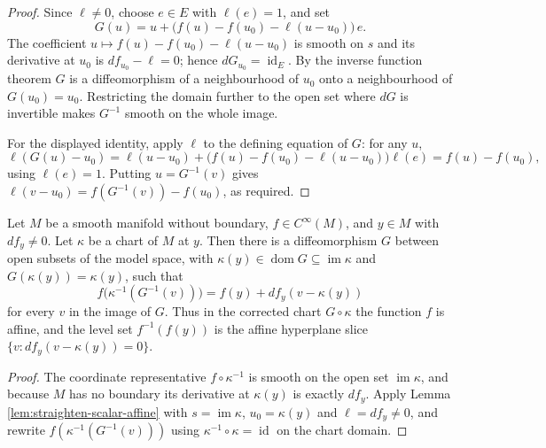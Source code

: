 \begin{proof}
\leanok
Since $\ell \neq 0$, choose $e \in E$ with $\ell(e) = 1$, and set
\[
  G(u) = u + \bigl(f(u) - f(u_0) - \ell(u - u_0)\bigr)\, e .
\]
The coefficient $u \mapsto f(u) - f(u_0) - \ell(u - u_0)$ is smooth on $s$ and its derivative at $u_0$ is $df_{u_0} - \ell = 0$; hence $dG_{u_0} = \operatorname{id}_E$. By the inverse function theorem $G$ is a diffeomorphism of a neighbourhood of $u_0$ onto a neighbourhood of $G(u_0) = u_0$. Restricting the domain further to the open set where $dG$ is invertible makes $G^{-1}$ smooth on the whole image.

For the displayed identity, apply $\ell$ to the defining equation of $G$: for any $u$,
\[
  \ell(G(u) - u_0) = \ell(u - u_0) + \bigl(f(u) - f(u_0) - \ell(u - u_0)\bigr)\ell(e) = f(u) - f(u_0),
\]
using $\ell(e) = 1$. Putting $u = G^{-1}(v)$ gives $\ell(v - u_0) = f(G^{-1}(v)) - f(u_0)$, as required.
\end{proof}

\begin{lemma}
\label{lem:adapted-chart-scalar-affine}
\leanok
{}
Let $M$ be a smooth manifold without boundary, $f \in C^\infty(M)$, and $y \in M$ with $df_y \neq 0$. Let $\kappa$ be a chart of $M$ at $y$. Then there is a diffeomorphism $G$ between open subsets of the model space, with $\kappa(y) \in \operatorname{dom} G \subseteq \operatorname{im} \kappa$ and $G(\kappa(y)) = \kappa(y)$, such that
\[
  f\bigl(\kappa^{-1}(G^{-1}(v))\bigr) = f(y) + df_y(v - \kappa(y))
\]
for every $v$ in the image of $G$. Thus in the corrected chart $G \circ \kappa$ the function $f$ is affine, and the level set $f^{-1}(f(y))$ is the affine hyperplane slice $\{v : df_y(v - \kappa(y)) = 0\}$.
\end{lemma}

\begin{proof}
\leanok
{}
The coordinate representative $f \circ \kappa^{-1}$ is smooth on the open set $\operatorname{im} \kappa$, and because $M$ has no boundary its derivative at $\kappa(y)$ is exactly $df_y$. Apply Lemma \ref{lem:straighten-scalar-affine} with $s = \operatorname{im}\kappa$, $u_0 = \kappa(y)$ and $\ell = df_y \neq 0$, and rewrite $f(\kappa^{-1}(G^{-1}(v)))$ using $\kappa^{-1} \circ \kappa = \operatorname{id}$ on the chart domain.
\end{proof}


